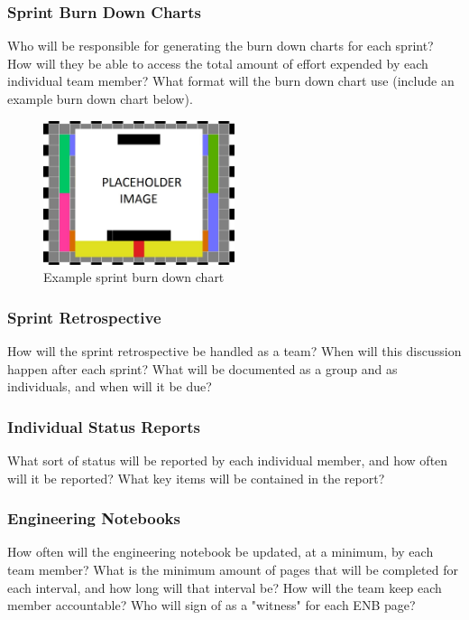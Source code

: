 \subsubsection{Sprint Burn Down Charts}
Who will be responsible for generating the burn down charts for each sprint? How will they be able to access the total amount of effort expended by each individual team member? What format will the burn down chart use (include an example burn down chart below).

\begin{figure}[h!]
    \centering
    \includegraphics[width=0.5\textwidth]{images/test_image}
    \caption{Example sprint burn down chart}
\end{figure}

\subsubsection{Sprint Retrospective}
How will the sprint retrospective be handled as a team? When will this discussion happen after each sprint? What will be documented as a group and as individuals, and when will it be due?

\subsubsection{Individual Status Reports}
What sort of status will be reported by each individual member, and how often will it be reported? What key items will be contained in the report?

\subsubsection{Engineering Notebooks}
How often will the engineering notebook be updated, at a minimum, by each team member? What is the minimum amount of pages that will be completed for each interval, and how long will that interval be? How will the team keep each member accountable? Who will sign of as a "witness" for each ENB page?



